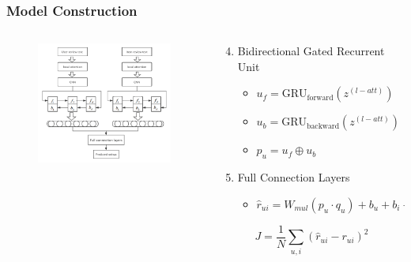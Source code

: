 \documentclass{../presentation}
\begin{document}
    \begin{frame}
        \frametitle{Model Construction}

        \begin{columns}
            \begin{column}{0.4\textwidth}
                \begin{figure}
                    \centering
                    \includegraphics[width=5cm]{img/gp01-2.png}
                \end{figure}
            \end{column}

            \begin{column}{0.5\textwidth}
                \begin{enumerate}
                    \setcounter{enumi}{3}
                    \item Bidirectional Gated Recurrent Unit
                    \begin{itemize}
                        \item $u_f=\text{GRU}_{\text{forward}}\left(z^{(l-att)}\right)$
                        \item $u_b=\text{GRU}_{\text{backward}}\left(z^{(l-att)}\right)$
                        \item $p_u=u_f\oplus u_b$
                    \end{itemize}
                    \item Full Connection Layers
                    \begin{itemize}
                        \item $\hat r_{ui}=W_{mul}(p_u\cdot q_u)+b_u+b_i+\mu$
                    \end{itemize}
                \end{enumerate}

                \begin{equation}
                    J=\frac{1}{N}\sum_{u, i}\left(\hat r_{ui} - r_{ui}\right)^2
                \end{equation}
            \end{column}
        \end{columns}

    \end{frame}
\end{document}
